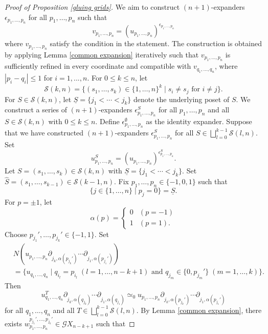 \documentclass[oneside, 12pt]{amsart}
\numberwithin{equation}{section}
\theoremstyle{plain}
\theoremstyle{definition}
\theoremstyle{remark}
\begin{document}
	\begin{proof}
		[Proof of Proposition \ref{gluing grids}]
		We aim to construct $(n+1)$-expanders $\epsilon_{p_1,\ldots,p_n}$ for all $p_1,\ldots,p_n$ such that
		\[
		v_{p_1,\ldots,p_n}=(u_{p_1,\ldots,p_n})^{\epsilon_{p_1,\ldots,p_n}}
		\]
		where $v_{p_1,\ldots,p_n}$ satisfy the condition in the statement. The construction is obtained by applying Lemma \ref{common expansion} iteratively such that $v_{p_1,\ldots,p_n}$ is sufficiently refined in every coordinate and compatible with $v_{q_1,\ldots,q_n}$, where $|p_i-q_i|\le1$ for $i=1,...,n$. For $0\le k\le n$, let
		\[
		\mathcal{S}(k,n)=\{(s_1,\ldots,s_k)\in\{1,\ldots,n\}^k\mid s_i\ne s_j\text{ for }i\ne j\}.
		\]
		For $S\in\mathcal{S}(k,n)$, let $\underline{S}=\{j_1<\cdots<j_k\}$ denote the underlying poset of $S$. We construct a series of $(n+1)$-expanders $\epsilon_{p_1,\ldots,p_n}^S$ for all $p_1,\ldots,p_n$ and all $S\in\mathcal{S}(k,n)$ with $0\le k\le n$. Define $\epsilon_{p_1,\ldots,p_n}^\emptyset$ as the identity expander. Suppose that we have constructed $(n+1)$-expanders $\epsilon_{p_1,\ldots,p_n}^S$ for all $S\in\bigsqcup_{l=0}^{k-1}\mathcal{S}(l,n)$. Set
		\[
		u_{p_1,\ldots,p_n}^S=(u_{p_1,\ldots,p_n})^{\epsilon_{p_1,\ldots,p_n}^S}.
		\]
		Let $S=(s_1,\ldots,s_k)\in\mathcal{S}(k,n)$ with $\underline{S}=\{j_1<\cdots<j_k\}$. Set $\widehat{S}=(s_1,\ldots,s_{k-1})\in\mathcal{S}(k-1,n)$. Fix $p_1,\ldots,p_n\in\{-1,0,1\}$ such that
		\[
		\{j\in\{1,\ldots,n\}\mid p_j=0\}=\underline{S}.
		\]
		For $p=\pm 1$, let
		\[
		\alpha(p)=
		\begin{cases}
			0&(p=-1)\\
			1&(p=1).
		\end{cases}
		\]
		Choose $p_{j_1}',\ldots,p_{j_k}'\in\{-1,1\}$. Set
		\begin{align*}
			&N(u_{p_1,\ldots,p_n}\partial_{j_k,\alpha(p_{j_k}')}\cdots\partial_{j_1,\alpha(p_{j_1}')})\\
			&=\{u_{q_1,\ldots,q_n}\mid q_{i_l}=p_{i_l}\;(l=1,\ldots,n-k+1)\text{ and }q_{j_m}\in\{0,p_{j_m}'\}\;(m=1,\ldots,k)\}.
		\end{align*}
		Then
		\[
		u_{q_1,\ldots,q_n}^T\partial_{j_k,\alpha(q_{j_k})}\cdots\partial_{j_1,\alpha(q_{j_1})}\simeq_0u_{p_1,\ldots,p_n}\partial_{j_k,\alpha(p_{j_k}')}\cdots\partial_{j_1,\alpha(p_{j_1}')}
		\]
		for all $q_1,\ldots,q_n$ and all $T\in\bigsqcup_{l=0}^{k-1}\mathcal{S}(l,n)$. By Lemma \ref{common expansion}, there exists $w_{p_1,\ldots,p_n}^{p_{j_1}',\ldots,p_{j_k}'}\in\mathcal{G}X_{n-k+1}$ such that

\end{proof}
\end{document}
